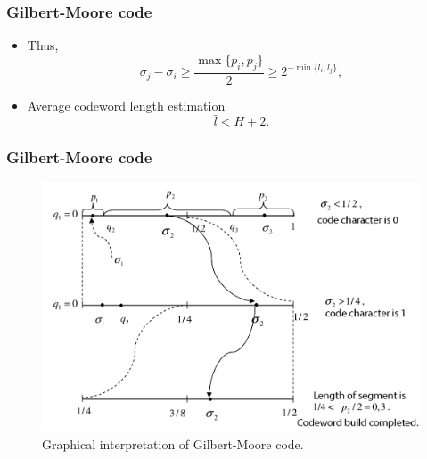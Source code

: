 \documentclass[14pt]{beamer}
\begin{document}
\begin{frame}
\frametitle{Gilbert-Moore code}
\begin{itemize}    

    \item Thus,
    \[
    \sigma _j - \sigma _i \ge
    \frac{\max \{p_i ,p_j \}}{2} \ge 2^{ - \min \{l_i ,l_j \}},
    \]
    
    \item Average codeword length estimation
    \[
    \bar {l} < H + 2.
    \]

\end{itemize}
\end{frame}


\begin{frame}
\frametitle{Gilbert-Moore code}
\begin{itemize}    

\begin{figure}[ht]
\begin{minipage}{1.0\linewidth}
\includegraphics[width=1.0\textwidth]{fig2_8.png}
\caption{Graphical interpretation of Gilbert-Moore code.}
\label{GM_graph}
\end{minipage}
\end{figure}

\end{itemize}
\end{frame}

\end{document}
